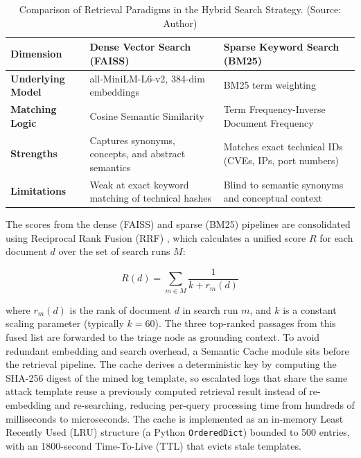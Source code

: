 \begin{table}[!htbp]
    \centering
    \caption{Comparison of Retrieval Paradigms in the Hybrid Search Strategy. (Source: Author)}
    \label{tab:search_comparison}
    \begin{tabular}{|>{\raggedright\arraybackslash}p{}|>{\raggedright\arraybackslash}p{}|>{\raggedright\arraybackslash}p{}|}
        \hline
        \textbf{Dimension} & \textbf{Dense Vector Search (FAISS)} & \textbf{Sparse Keyword Search (BM25)} \\
        \hline
        \textbf{Underlying Model} & all-MiniLM-L6-v2, 384-dim embeddings \cite{reimers2019sentence} & BM25 term weighting \\
        \hline
        \textbf{Matching Logic} & Cosine Semantic Similarity \cite{faiss2019} & Term Frequency-Inverse Document Frequency \cite{bm25_2009} \\
        \hline
        \textbf{Strengths} & Captures synonyms, concepts, and abstract semantics & Matches exact technical IDs (CVEs, IPs, port numbers) \\
        \hline
        \textbf{Limitations} & Weak at exact keyword matching of technical hashes & Blind to semantic synonyms and conceptual context \\
        \hline
    \end{tabular}
\end{table}

The scores from the dense (FAISS) and sparse (BM25) pipelines are consolidated using Reciprocal Rank Fusion (RRF) \cite{rrf2009}, which calculates a unified score $R$ for each document $d$ over the set of search runs $M$:

\begin{equation}
    R(d) = \sum_{m \in M} \frac{1}{k + r_m(d)}
\end{equation}

where $r_m(d)$ is the rank of document $d$ in search run $m$, and $k$ is a constant scaling parameter (typically $k=60$). The three top-ranked passages from this fused list are forwarded to the triage node as grounding context. To avoid redundant embedding and search overhead, a Semantic Cache module sits before the retrieval pipeline. The cache derives a deterministic key by computing the SHA-256 digest of the mined log template, so escalated logs that share the same attack template reuse a previously computed retrieval result instead of re-embedding and re-searching, reducing per-query processing time from hundreds of milliseconds to microseconds. The cache is implemented as an in-memory Least Recently Used (LRU) structure (a Python \texttt{OrderedDict}) bounded to 500 entries, with an 1800-second Time-To-Live (TTL) that evicts stale templates.

